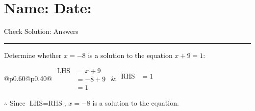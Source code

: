 \documentclass[12pt]{article}
\def \HeadingAnswers {\section*{\Large Name: \underline{\hspace{8cm}} \hfill Date: \underline{\hspace{3cm}}} \vspace{-3mm}
{Check Solution: Answers} \vspace{1pt}\hrule}
\newcounter{minipagecount}
\begin{document}
\HeadingAnswers
\vspace{4mm}
\begin{multicols}{2}
\noindent{(\theminipagecount)}\hspace{0.1mm} %
\begin{minipage}[t]{0.40\textwidth} %

    \noindent Determine whether \(x = -8\) is a solution to the equation \(x + 9 = 1\):
    \vspace{2pt}  %

    \noindent
    \renewcommand{\arraystretch}{1.3} %
    \begin{tabular}{@{}p{0.60\linewidth}@{}p{0.40\linewidth}@{}}
        \(\begin{aligned}
            \text{LHS} &= x + 9 \\
                    &= -8 + 9 \\
                    &= 1 
        \end{aligned}\) &
        \(\begin{aligned}
            \text{RHS} &= 1\\
                    & \\
                    &
        \end{aligned}\)
    \end{tabular}
    \renewcommand{\arraystretch}{1.0} %
    \vspace{2pt}  %

    \noindent \(\therefore\) Since \(\text{LHS} = \text{RHS}\), \(x = -8\) is  a solution to the equation.

\end{minipage}

\vspace*{0.5ex}
\vfill{}
\noindent{(\theminipagecount)}\hspace{0.1mm} %
\begin{minipage}[t]{0.40\textwidth} %


\end{minipage}
\end{multicols}
\end{document}

